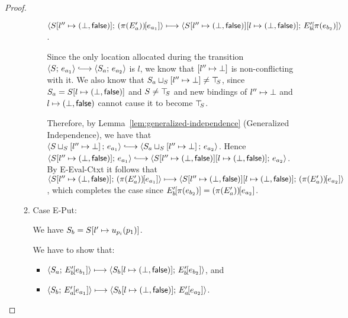 \begin{proof}
\begin{enumerate}
\begin{enumerate}
\begin{itemize}
          $\langle S[l'' \mapsto (\bot, \textsf{false})];\, (\pi(E'_a))\hspace{-1mm}\left[e_{a_1}\right] \rangle
          \longmapsto
          \langle S[l'' \mapsto (\bot, \textsf{false})][l \mapsto (\bot, \textsf{false})];\, E'_b\hspace{-1mm}\left[\pi(e_{b_2})\right] \rangle$.

          Since the only location allocated during the transition
          $\config{S}{e_{a_1}} \parstepsto \config{S_a}{e_{a_2}}$ is
          $l$, we know that $\left[ l'' \mapsto \bot \right]$ is
          non-conflicting with it.  We also know that
          $S_a \sqcup_{S} \left[ l'' \mapsto \bot \right] \neq
          \top\hspace{-0.85mm}_{S}$, since $S_a = S[l \mapsto (\bot, \textsf{false})]$ and $S \neq
          \top\hspace{-0.85mm}_{S}$ and new bindings of $l'' \mapsto \bot$ and
          $l \mapsto (\bot, \textsf{false})$ cannot cause it to become
          $\top\hspace{-0.85mm}_{S}$.


          Therefore, by Lemma~\ref{lem:generalized-independence}
          (Generalized Independence), we have that
          $\config{\lubstore{S}{\store{\storebindingRaw{l''}{\bot}}}}{e_{a_1}}
          \parstepsto
          \config{\lubstore{S_a}{\store{\storebindingRaw{l''}{\bot}}}}{e_{a_2}}$.
          Hence $\config{\extS{S}{l''}{\bot}{\frozenfalse}}{e_{a_1}} \parstepsto
          \config{\extS{\extS{S}{l''}{\bot}{\frozenfalse}}{l}{\bot}{\frozenfalse}}{e_{a_2}}$.
          By {\sc E-Eval-Ctxt} it follows that
          $\langle S[l'' \mapsto (\bot, \textsf{false})];\, (\pi(E'_a))\hspace{-1mm}\left[e_{a_1}\right] \rangle
          \longmapsto
          \langle S[l'' \mapsto (\bot, \textsf{false})][l \mapsto (\bot, \textsf{false})];\, (\pi(E'_a))\hspace{-1mm}\left[e_{a_2}\right] \rangle$,
          which completes the case since
          $E'_b\hspace{-1mm}\left[\pi(e_{b_2})\right] =
          (\pi(E'_a))\hspace{-1mm}\left[e_{a_2}\right]$.


      \end{itemize}

    \item \label{slqc-new-put}Case {\sc E-Put}:


      We have $S_b = S[l' \mapsto u_{p_i}(p_1)]$.

      We have to show that:
      \begin{itemize}
      \item $\langle S_a;\, E'_b\hspace{-1mm}\left[e_{b_1}\right] \rangle \longmapsto
        \langle S_b[l \mapsto (\bot, \textsf{false})];\, E'_b\hspace{-1mm}\left[e_{b_2}\right] \rangle$,
        and
      \item
        $\langle S_b;\, E'_a\hspace{-1mm}\left[e_{a_1}\right] \rangle \longmapsto
        \langle S_b[l \mapsto (\bot, \textsf{false})];\, E'_a\hspace{-1mm}\left[e_{a_2}\right] \rangle$.
      \end{itemize}


\end{enumerate}
\end{enumerate}
\end{proof}
